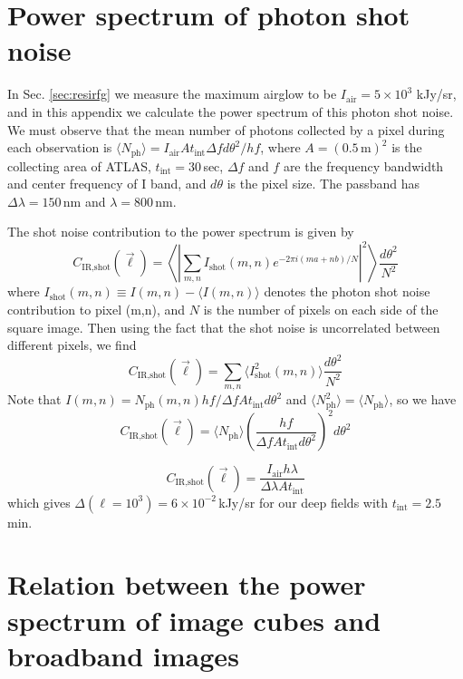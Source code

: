 \documentclass[numberedappendix]{emulateapj}
\newcommand{\IR}{\text{IR}}
\newcommand{\shot}{\text{shot}}
\begin{document}
\appendix

\section{Power spectrum of photon shot noise}
\label{sec:Pshot}

In Sec. \ref{sec:resirfg} we measure the maximum airglow to be $I_\text{air}=5\times10^3$ kJy/sr, and in this appendix we calculate the power spectrum of this photon shot noise. We must observe that the mean number of photons collected by a pixel during each observation is $\langle N_\text{ph}\rangle=I_\text{air}At_\text{int} \Delta f d\theta^2/hf$, where $A=(0.5\,\text{m})^2$ is the collecting area of ATLAS, $t_\text{int}=30\,$sec, $\Delta f$ and $f$ are the frequency bandwidth and center frequency of I band, and $d\theta$ is the pixel size. The passband has $\Delta\lambda=150\,$nm and $\lambda=800\,$nm. 

The shot noise contribution to the power spectrum is given by
\begin{equation}
C_{\IR, \shot}(\vec{\ell}) = \left\langle\left|\sum_{m,n}I_\shot(m,n)e^{-2\pi i(ma+nb)/N}\right|^2\right\rangle \frac{d\theta^2}{N^2}
\end{equation}
where $I_\shot(m,n)\equiv I(m,n)-\langle I(m,n)\rangle$ denotes the photon shot noise contribution to pixel (m,n), and $N$ is the number of pixels on each side of the square image. Then using the fact that the shot noise is uncorrelated between different pixels, we find
\begin{equation}
C_{\IR, \shot}(\vec{\ell}) = \sum_{m,n}\langle I^2_\shot(m,n)\rangle \frac{d\theta^2}{N^2}
\end{equation}
Note that $I(m,n)=N_\text{ph}(m,n)hf/\Delta f A t_\text{int}d\theta^2$ and $\langle N_\text{ph}^2\rangle = \langle N_\text{ph}\rangle$, so we have
\begin{equation}
C_{\IR, \shot}(\vec{\ell}) = \langle N_\text{ph}\rangle \left(\frac{hf}{\Delta f A t_\text{int}d\theta^2}\right)^2 d\theta^2
\end{equation}

\begin{equation}
C_{\IR, \shot}(\vec{\ell}) =\frac{I_\text{air}h\lambda}{\Delta \lambda A t_\text{int}}
\end{equation}
which gives $\Delta(\ell=10^3)=6\times10^{-2}$\,kJy/sr for our deep fields with $t_\text{int}=2.5$\,min. %

\section{Relation between the power spectrum of image cubes and broadband images}
\label{sec:pspecrelation}
\end{document}

